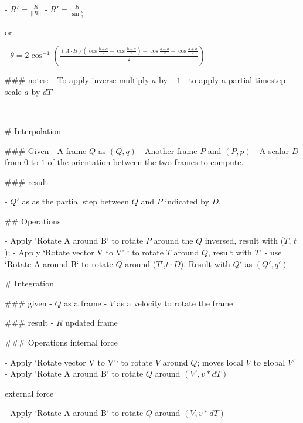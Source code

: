 - $  R' = \frac R {||R||} $  
- $  R' = \frac R {\sin \frac \theta 2} $  

or

- $\theta = 2 \cos^{-1} ( \frac { (A \cdot B) ( \cos \frac {b + a} 2  - \cos \frac {b - a} 2 ) +  \cos \frac {b - a} 2  +  \cos \frac {b + a} 2 } 2 ) $



### notes:
 - To apply inverse multiply $a$ by $-1$ 
 - to apply a partial timestep scale $a$ by $dT$





---

# Interpolation

### Given
- A frame $Q$ as $(Q,q)$
- Another frame $P$ and $(P,p)$
- A scalar $D$ from $0$ to $1$ of the orientation between the two frames to compute.

### result

- $Q'$ as as the partial step between $Q$ and $P$ indicated by $D$.

## Operations

- Apply `Rotate A around B` to rotate $P$ around the $Q$ inversed, result with ($T$, $t$);
- Apply `Rotate vector V to V' ` to rotate $T$ around $Q$, result with $T'$
- use `Rotate A around B` to rotate $Q$ around ($T'$,$t \cdot D$).  Result with $Q'$  as $(Q',q')$


# Integration

### given
- $Q$ as a frame 
- $V$ as a velocity to rotate the frame

### result
- $R$ updated frame

### Operations
internal force

- Apply `Rotate vector V to V'` to rotate $V$ around ${Q}$; moves local $V$ to global $V'$
- Apply `Rotate A around B` to rotate ${Q}$ around $(V',v * dT)$

external force
  
- Apply `Rotate A around B` to rotate ${Q}$ around $(V,v * dT)$


